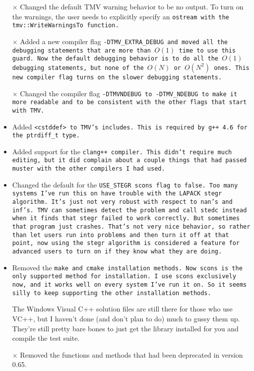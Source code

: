 \begin{itemize}
\item[$\times$]
Changed the default TMV warning behavior to be no output.  To turn on the warnings, the user needs to explicitly specify an \tt{ostream} with the \tt{tmv::WriteWarningsTo} function.

\item[$\times$]
Added a new compiler flag \tt{-DTMV\_EXTRA\_DEBUG} and moved all the debugging statements that are more than $O(1)$ time to use this guard.  Now the default debugging behavior is to do all the $O(1)$ debugging statements, but none of the $O(N)$ or $O(N^2)$ ones.  This new compiler flag turns on the slower debugging statements.

\item[$\times$]
Changed the compiler flag \tt{-DTMVNDEBUG} to \tt{-DTMV\_NDEBUG} to make it more readable and to be consistent with the other flags that start with \tt{TMV}.

\item
Added \tt{<cstddef>} to TMV's includes.
This is required by g++ 4.6 for the \tt{ptrdiff\_t} type.

\item 
Added support for the \tt{clang++} compiler.  This didn't require much editing, but it did complain about a couple things that had passed muster with the other compilers I had used.

\item
Changed the default for the \tt{USE\_STEGR} \tt{scons} flag to \tt{false}.  Too many
systems I've run this on have trouble with the LAPACK \tt{stegr} algorithm.
It's just not very robust with respect to \tt{nan}'s and \tt{inf}'s.  TMV can
sometimes detect the problem and call \tt{stedc} instead when it finds 
that \tt{stegr} failed to work correctly.  But sometimes that program just
crashes.  That's not very nice behavior, so rather than let users run 
into problems and then turn it off at that point, now
using the \tt{stegr} algorithm is considered a feature for advanced users to turn on if 
they know what they are doing.

\item
Removed the \tt{make} and \tt{cmake} installation methods.  
Now \tt{scons} is the 
only supported method for installation.  I use \tt{scons} exclusively now, 
and it works well on every system I've run it on.  So it seems silly
to keep supporting the other installation methods.  

The Windows Visual C++ solution files are still there for those who use VC++,
but I haven't done (and don't plan to do) much to gussy them up.  They're
still pretty bare bones to just get the library installed for you and
compile the test suite.

\item[$\times$]
Removed the functions and methods that had been deprecated in version 0.65.


\end{itemize}
